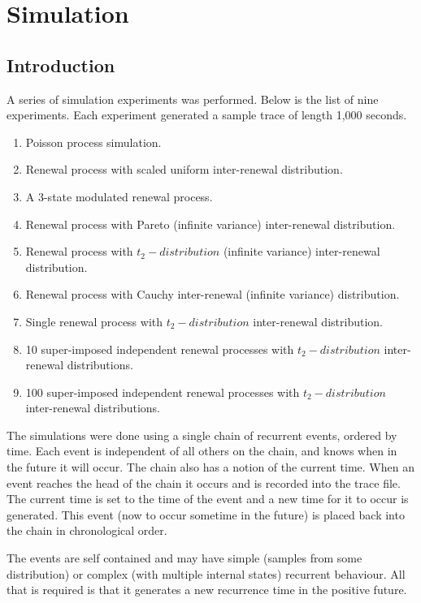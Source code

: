 \chapter{Simulation}
\label{simulation}

\section{Introduction}

A series of simulation experiments was performed.  Below is the list
of nine experiments.  Each experiment generated a sample trace of
length 1,000 seconds.

\begin{enumerate}
\item	Poisson process simulation.
\item	Renewal process with scaled uniform inter-renewal distribution.
\item	A 3-state modulated renewal process.
\item	Renewal process with Pareto (infinite variance) inter-renewal distribution.
\item	Renewal process with $t_2-distribution$ (infinite variance) inter-renewal distribution.
\item	Renewal process with Cauchy inter-renewal (infinite variance) distribution.
\item	Single renewal process with $t_2-distribution$ inter-renewal distribution.
\item	10 super-imposed independent renewal processes with $t_2-distribution$ inter-renewal distributions.
\item	100 super-imposed independent renewal processes with $t_2-distribution$ inter-renewal distributions.
\end{enumerate}

The simulations were done using a single chain of recurrent events,
ordered by time.  Each event is independent of all others on the
chain, and knows when in the future it will occur.  The chain also has
a notion of the current time.  When an event reaches the head of the
chain it occurs and is recorded into the trace file.  The current time
is set to the time of the event and a new time for it to occur is
generated.  This event (now to occur sometime in the future) is placed
back into the chain in chronological order.

The events are self contained and may have simple (samples from some
distribution) or complex (with multiple internal states) recurrent
behaviour.  All that is required is that it generates a new recurrence
time in the positive future.

